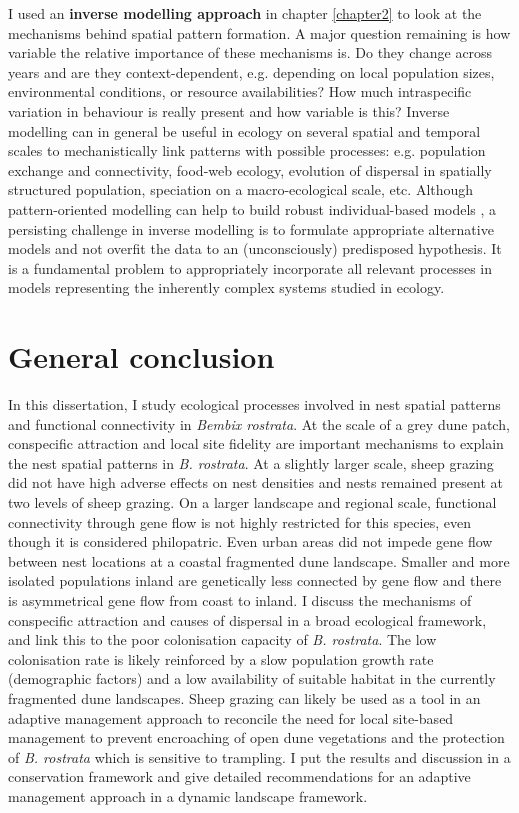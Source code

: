 \documentclass[10pt, twoside]{book} %
\begin{document}
	\enlargethispage{1\baselineskip}
	I used an \textbf{inverse modelling approach} in chapter \ref{chapter2} to look at the mechanisms behind spatial pattern formation. A major question remaining is how variable the relative importance of these mechanisms is. Do they change across years and are they context-dependent, e.g. depending on local population sizes, environmental conditions, or resource availabilities? How much intraspecific variation in behaviour is really present and how variable is this? Inverse modelling can in general be useful in ecology on several spatial and temporal scales to mechanistically link patterns with possible processes: e.g. population exchange and connectivity, food-web ecology, evolution of dispersal in spatially structured population, speciation on a macro-ecological scale, etc. Although pattern-oriented modelling can help to build robust individual-based models \citep{grimm2005}, a persisting challenge in inverse modelling is to formulate appropriate alternative models and not overfit the data to an (unconsciously) predisposed hypothesis. It is a fundamental problem to appropriately incorporate all relevant processes in models representing the inherently complex systems studied in ecology.\clearpage

 	\section{General conclusion}
 	In this dissertation, I study ecological processes involved in nest spatial patterns and functional connectivity in \textit{Bembix rostrata}. At the scale of a grey dune patch, conspecific attraction and local site fidelity are important mechanisms to explain the nest spatial patterns in \textit{B. rostrata}. At a slightly larger scale, sheep grazing did not have high adverse effects on nest densities and nests remained present at two levels of sheep grazing. On a larger landscape and regional scale, functional connectivity through gene flow is not highly restricted for this species, even though it is considered philopatric. Even urban areas did not impede gene flow between nest locations at a coastal fragmented dune landscape. Smaller and more isolated populations inland are genetically less connected by gene flow and there is asymmetrical gene flow from coast to inland. I discuss the mechanisms of conspecific attraction and causes of dispersal in a broad ecological framework, and link this to the poor colonisation capacity of \textit{B. rostrata}. The low colonisation rate is likely reinforced by a slow population growth rate (demographic factors) and a low availability of suitable habitat in the currently fragmented dune landscapes. Sheep grazing can likely be used as a tool in an adaptive management approach to reconcile the need for local site-based management to prevent encroaching of open dune vegetations and the protection of \textit{B. rostrata} which is sensitive to trampling. I put the results and discussion in a conservation framework and give detailed recommendations for an adaptive management approach in a dynamic landscape framework.\\
 	
\end{document}
